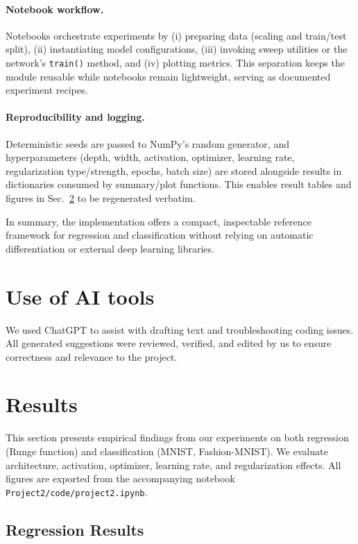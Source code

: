 \documentclass[amssymb,twocolumn,aps]{revtex4}
\begin{document}
\paragraph{Notebook workflow.} Notebooks orchestrate experiments by (i) preparing data (scaling and train/test split), (ii) instantiating model configurations, (iii) invoking sweep utilities or the network's \texttt{train()} method, and (iv) plotting metrics. This separation keeps the module reusable while notebooks remain lightweight, serving as documented experiment recipes.

\paragraph{Reproducibility and logging.} Deterministic seeds are passed to NumPy's random generator, and hyperparameters (depth, width, activation, optimizer, learning rate, regularization type/strength, epochs, batch size) are stored alongside results in dictionaries consumed by summary/plot functions. This enables result tables and figures in Sec.~\ref{section:results} to be regenerated verbatim.

In summary, the implementation offers a compact, inspectable reference framework for regression and classification without relying on automatic differentiation or external deep learning libraries.

\section{Use of AI tools}
We used ChatGPT\cite{openai2025chatgpt} to assist with drafting text and troubleshooting coding issues. All generated suggestions were reviewed, verified, and edited by us to ensure correctness and relevance to the project.


\section{Results}\label{section:results}

This section presents empirical findings from our experiments on both regression (Runge function) and classification (MNIST, Fashion-MNIST). We evaluate architecture, activation, optimizer, learning rate, and regularization effects. All figures are exported from the accompanying notebook \texttt{Project2/code/project2.ipynb}.

\subsection{Regression Results}
\end{document}

